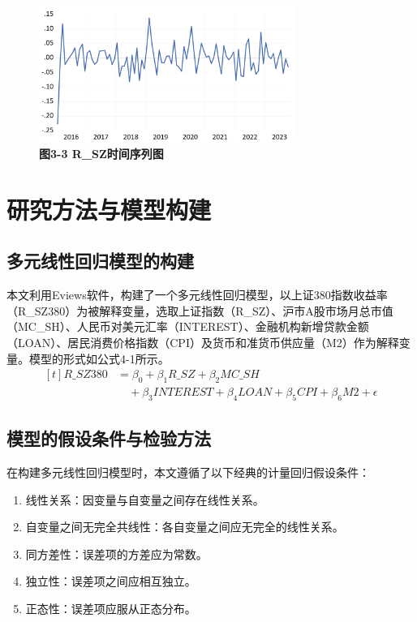 \documentclass[12pt, a4paper]{article}
\numberwithin{equation}{section}
\begin{document}
\begin{figure}[h!]
    \centering
    \includegraphics[width=0.75\textwidth]{./img/r_sz.png}
    \captionsetup{labelformat=empty}
    \caption{\textbf{\fontsize{9pt}{11pt}\selectfont 图3-3 R\_SZ时间序列图}}
\end{figure}

\clearpage

\newpage
\section{研究方法与模型构建}
\subsection{多元线性回归模型的构建}
本文利用Eviews软件，构建了一个多元线性回归模型，以上证380指数收益率（R\_SZ380）为被解释变量，选取上证指数（R\_SZ）、沪市A股市场月总市值（MC\_SH）、人民币对美元汇率（INTEREST）、金融机构新增贷款金额（LOAN）、居民消费价格指数（CPI）及货币和准货币供应量（M2）作为解释变量。模型的形式如公式4-1所示。
\begin{equation}
    \begin{aligned}[t]
        R\_SZ380 & = \beta_0 + \beta_1 R\_SZ + \beta_2 MC\_SH                                    \\
                 & \quad + \beta_3 INTEREST + \beta_4 LOAN + \beta_5 CPI + \beta_6 M2 + \epsilon
    \end{aligned}
    \tag{4-1}
\end{equation}

\subsection{模型的假设条件与检验方法}
在构建多元线性回归模型时，本文遵循了以下经典的计量回归假设条件：
\begin{enumerate}[label=\arabic*)]
    \item 线性关系：因变量与自变量之间存在线性关系。
    \item 自变量之间无完全共线性：各自变量之间应无完全的线性关系。
    \item 同方差性：误差项的方差应为常数。
    \item 独立性：误差项之间应相互独立。
    \item 正态性：误差项应服从正态分布。
\end{enumerate}
\end{document}
